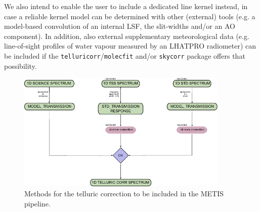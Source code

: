 We also intend to enable the user to include a dedicated line kernel instead, in case a reliable kernel model can be determined with other (external) tools (e.g. a model-based convolution of an internal \ac{LSF}, the slit-widths and/or an \ac{AO} component). In addition, also external supplementary meteorological data (e.g. line-of-sight profiles of water vapour measured by an \ac{LHATPRO} radiometer) can be included if the \texttt{telluricorr}/\texttt{molecfit} and/or \texttt{skycorr} package offers that possibility.
\begin{figure}[ht]
  \centering
  \includegraphics[width=0.9\textwidth]{figures/tell_corr_methods.pdf}
    \caption[Methods for the telluric correction to be included in the METIS pipeline]{%
        Methods for the telluric correction to be included in the \ac{METIS} pipeline.}
  \label{Fig:tellcorrmethods}
\end{figure}
